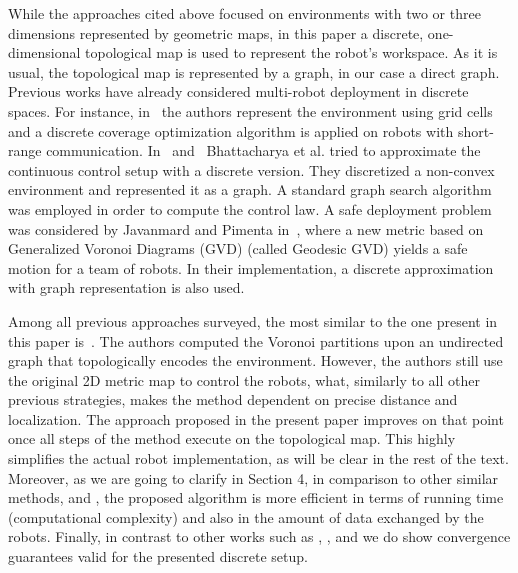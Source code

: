 \documentclass[smallcondensed]{svjour3}
\begin{document}
While the approaches cited above focused on environments with two or three dimensions represented by geometric maps, in this paper a discrete, one-dimensional topological map is used to represent the robot's workspace. As it is usual, the topological map is represented by a graph, in our case a direct graph.
% 
Previous works have already considered multi-robot deployment in discrete spaces. For instance, in~\cite{Durham2012} the authors represent the environment using grid cells and a discrete coverage optimization algorithm is applied on robots with short-range communication.
% 
In~\cite{Bhattacharya2013a} and~\cite{Bhattacharya2013IJRR} Bhattacharya et al. tried to approximate the continuous control setup with a discrete version. They discretized a non-convex environment and represented it as a graph. A standard graph search algorithm was employed in order to compute the control law.
%
A safe deployment problem was considered by Javanmard  and Pimenta in~\cite{reza2014}, where a new metric based on Generalized Voronoi Diagrams (GVD) (\sloppy called Geodesic GVD) yields a safe motion for a team of robots. In their implementation, a discrete approximation with graph representation is also used. 

Among all previous approaches surveyed, the most similar to the one present in this paper is~\cite{Yun2013}. The authors computed the Voronoi partitions upon an undirected graph that topologically encodes the environment. However, the authors still use the original 2D metric map to control the robots, what, similarly to all other previous strategies, makes the method dependent on precise distance and localization. The approach proposed in the present paper improves on that point once all steps of the method execute on the topological map. This highly simplifies the actual robot implementation, as will be clear in the rest of the text. 
%
Moreover, as we are going to clarify in Section 4, in comparison to other similar methods, \cite{Yun2013} and \cite{Durham2012}, the proposed algorithm is more efficient in terms of running time (computational complexity) and also in the amount of data exchanged by the robots.
Finally, in contrast to other works such as \cite{Bhattacharya2013a}, \cite{Bhattacharya2013IJRR}, and \cite{reza2014} we do show convergence guarantees valid for the presented discrete setup.
\end{document}
